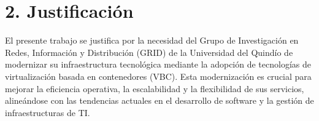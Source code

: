\section*{2. Justificación}
El presente trabajo se justifica por la necesidad del Grupo de Investigación en Redes, Información y Distribución (GRID) de la Universidad del Quindío de modernizar su infraestructura tecnológica mediante la adopción de tecnologías de virtualización basada en contenedores (VBC). Esta modernización es crucial para mejorar la eficiencia operativa, la escalabilidad y la flexibilidad de sus servicios, alineándose con las tendencias actuales en el desarrollo de software y la gestión de infraestructuras de TI.\@
